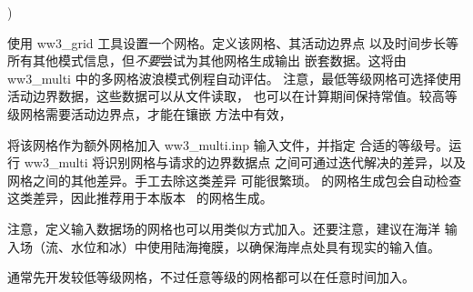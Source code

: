 \begin{list}{)}{
             \rightmargin 5mm 
              \leftmargin 10mm}

\item 使用 {\file ww3\_grid} 工具设置一个网格。定义该网格、其活动边界点
      以及时间步长等所有其他模式信息，但{\it 不要}尝试为其他网格生成输出
      嵌套数据。这将由 {\file ww3\_multi} 中的多网格波浪模式例程自动评估。
      注意，最低等级网格可选择使用活动边界数据，这些数据可以从文件读取，
      也可以在计算期间保持常值。较高等级网格需要活动边界点，才能在镶嵌
      方法中有效，

\item 将该网格作为额外网格加入 {\file ww3\_multi.inp} 输入文件，并指定
      合适的等级号。运行 {\file ww3\_multi} 将识别网格与请求的边界数据点
      之间可通过迭代解决的差异，以及网格之间的其他差异。手工去除这类差异
      可能很繁琐。\citet{tol:MMAB07a, tol:OMOD08a} 的网格生成包会自动检查
      这类差异，因此推荐用于本版本 \ws\ 的网格生成。

\end{list}

\noindent
注意，定义输入数据场的网格也可以用类似方式加入。还要注意，建议在海洋
输入场（流、水位和冰）中使用陆海掩膜，以确保海岸点处具有现实的输入值。

通常先开发较低等级网格，不过任意等级的网格都可以在任意时间加入。

